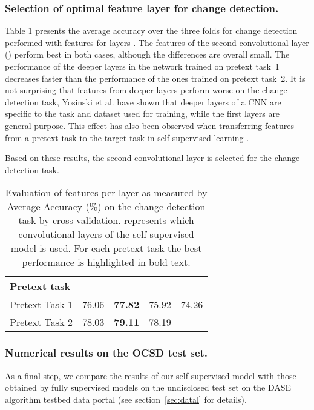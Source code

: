 \documentclass[runningheads]{llncs}
\begin{document}
\subsubsection{Selection of optimal feature layer for change detection.} 
Table \ref{tab:results_AA_layer_selection} presents the average accuracy  over the three folds for change detection performed with features  for layers . The features of the second convolutional layer () perform best in both cases, although the differences are overall small. The performance of the deeper layers in the network trained on pretext task~1 decreases faster than the performance of the ones trained on pretext task~2. It is not surprising that features from deeper layers perform worse on the change detection task, Yosinski et al. \cite{Yosinski:2014:transferring_features} have shown that deeper layers of a CNN are specific to the task and dataset used for training, while the first layers are general-purpose. This effect has also been observed when transferring features from a pretext task to the target task in self-supervised learning \cite{Kolesnikov:2019:self_supervised_comparison}.  

Based on these results, the second convolutional layer is selected for the change detection task.
\begin{table}[!t]
\caption[Evaluation of features per layer as measured by Average Accuracy on the change detection task.]{Evaluation of features per layer as measured by Average Accuracy (\%) on the change detection task by cross validation.  represents which convolutional layers of the self-supervised model is used. 
For each pretext task the best performance is highlighted in bold text.}  
\centering
\begin{tabular}{l|l|l|l|l} \hline
Pretext task &   &  &  &  \\
\hline\hline
Pretext Task 1 & 76.06 & \textbf{77.82} & 75.92 & 74.26 \\
Pretext Task 2 & 78.03 & \textbf{79.11} & 78.19 & \\
\hline
\end{tabular}
\label{tab:results_AA_layer_selection}
\end{table}

\subsubsection{Numerical results on the OCSD test set.} As a final step, we compare the results of our self-supervised model with those obtained by fully supervised models on the undisclosed test set on the DASE algorithm testbed data portal (see section~\ref{sec:datal} for details). 
\end{document}

